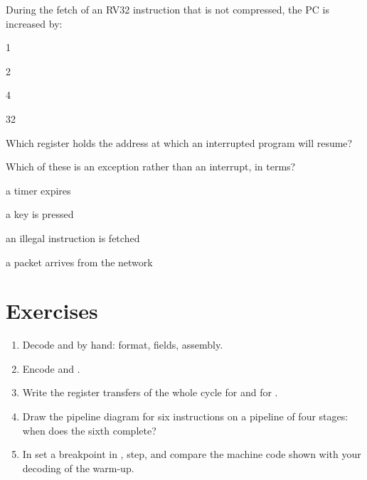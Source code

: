 \begin{quiz}{During the fetch of an RV32 instruction that is not compressed, the PC is increased by:}
\item 1
\item 2
\item 4
\item 32
\end{quiz}

\begin{quiz}{Which register holds the address at which an interrupted \riscv program will resume?}
\item {}
\item {}
\item {}
\item {}
\end{quiz}

\begin{quiz}{Which of these is an exception rather than an interrupt, in \riscv terms?}
\item a timer expires
\item a key is pressed
\item an illegal instruction is fetched
\item a packet arrives from the network
\end{quiz}

\section{Exercises}

\begin{exercise}
\begin{enumerate}[nosep]
\item Decode  and  by hand: format, fields,
  assembly.
\item Encode  and .
\item Write the register transfers of the whole cycle for
   and for .
\item Draw the pipeline diagram for six instructions on a pipeline of four
  stages: when does the sixth complete?
\item In \prgqt set a breakpoint in , step, and compare
  the machine code shown with your decoding of the warm-up.
\end{enumerate}
\end{exercise}

